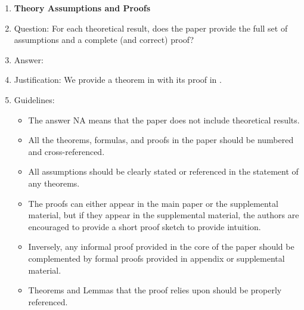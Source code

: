 \documentclass[11pt]{article}
\theoremstyle{plain}
\theoremstyle{definition}
\theoremstyle{remark}
\renewcommand{\^}[1]{^{(#1)}}
\begin{document}
\begin{enumerate}
\item {\bf Theory Assumptions and Proofs}
    \item[] Question: For each theoretical result, does the paper provide the full set of assumptions and a complete (and correct) proof?
    \item[] Answer: \answerYes{} 
    \item[] Justification: We provide a theorem in  with its proof in .
    \item[] Guidelines:
    \begin{itemize}
        \item The answer NA means that the paper does not include theoretical results. 
        \item All the theorems, formulas, and proofs in the paper should be numbered and cross-referenced.
        \item All assumptions should be clearly stated or referenced in the statement of any theorems.
        \item The proofs can either appear in the main paper or the supplemental material, but if they appear in the supplemental material, the authors are encouraged to provide a short proof sketch to provide intuition. 
        \item Inversely, any informal proof provided in the core of the paper should be complemented by formal proofs provided in appendix or supplemental material.
        \item Theorems and Lemmas that the proof relies upon should be properly referenced. 
    \end{itemize}


\end{enumerate}
\end{document}
